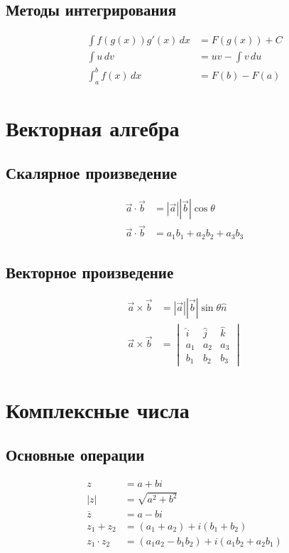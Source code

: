 \documentclass[10pt,landscape,a4paper]{article}
\begin{document}
\begin{multicols}{2}
\subsection{Методы интегрирования}
\begin{align}
    \int f(g(x))g'(x) \, dx &= F(g(x)) + C \\
    \int u \, dv &= uv - \int v \, du \\
    \int_a^b f(x) \, dx &= F(b) - F(a)
\end{align}

\section{Векторная алгебра}

\subsection{Скалярное произведение}
\begin{align}
    \vec{a} \cdot \vec{b} &= |\vec{a}||\vec{b}|\cos\theta \\
    \vec{a} \cdot \vec{b} &= a_1b_1 + a_2b_2 + a_3b_3
\end{align}

\subsection{Векторное произведение}
\begin{align}
    \vec{a} \times \vec{b} &= |\vec{a}||\vec{b}|\sin\theta \hat{n} \\
    \vec{a} \times \vec{b} &= \begin{vmatrix}
        \hat{i} & \hat{j} & \hat{k} \\
        a_1 & a_2 & a_3 \\
        b_1 & b_2 & b_3
    \end{vmatrix}
\end{align}

\section{Комплексные числа}

\subsection{Основные операции}
\begin{align}
    z &= a + bi \\
    |z| &= \sqrt{a^2 + b^2} \\
    \overline{z} &= a - bi \\
    z_1 + z_2 &= (a_1 + a_2) + i(b_1 + b_2) \\
    z_1 \cdot z_2 &= (a_1a_2 - b_1b_2) + i(a_1b_2 + a_2b_1)
\end{align}


\end{multicols}
\end{document}
